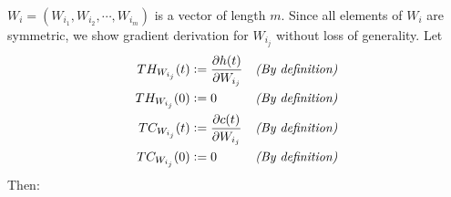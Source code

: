 \documentclass[twoside,11pt]{article}
\begin{document}
$W_i = (W_{i_1}, W_{i_2}, \cdots, W_{i_m})$ is a vector of length $m$. Since all elements of $W_i$ are symmetric, we show gradient derivation for $W_{i_j}$ without loss of generality. Let
\begin{align}
TH_{W_{i_j}}(t)  & \vcentcolon = \frac{\partial h(t)}{\partial W_{i_j}}  && \textit{(By definition)} \label{def1} \\
TH_{W_{i_j}}(0)  & \vcentcolon = 0  && \textit{(By definition)} \label{def2} \\
TC_{W_{i_j}}(t)  & \vcentcolon = \frac{\partial c(t)}{\partial W_{i_j}}  && \textit{(By definition)} \label{def3} \\
TC_{W_{i_j}}(0)  & \vcentcolon = 0  && \textit{(By definition)}  \label{def4}
\end{align}
Then:
\end{document}
